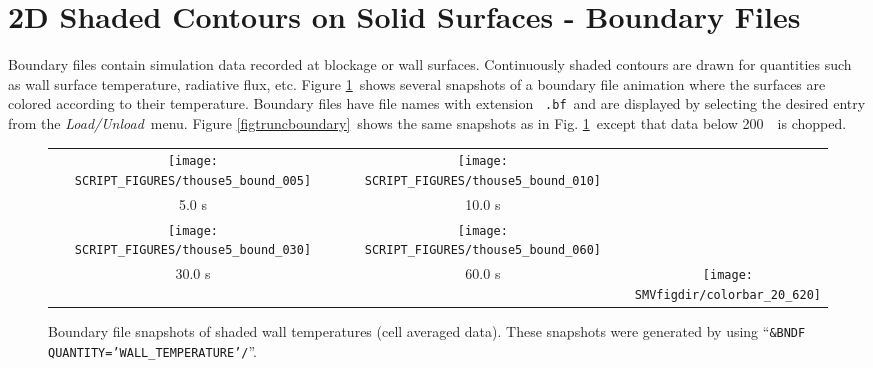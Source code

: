 \documentclass[11pt,twoside]{book}
\newcommand{\figheightAbar}{2.2in}
\begin{document}
\section{2D Shaded Contours on Solid Surfaces - Boundary Files}
\label{section:bf}
Boundary files contain simulation data recorded at blockage or
wall surfaces. Continuously shaded contours are drawn for
quantities such as wall surface temperature, radiative flux, etc.
Figure \ref{figboundary}\ shows several snapshots of a boundary
file animation where the surfaces are colored according to their
temperature. Boundary files have file names with extension {\tt
.bf}\ and are displayed by selecting the desired entry from the
{\em Load/Unload}\  menu. Figure \ref{figtruncboundary}\ shows the
same snapshots as in Fig. \ref{figboundary}\ except that data
below 200~\degC\ is chopped.
\begin{figure}[bph]
\begin{center}
\begin{tabular}{ccc}
\texttt{[image: SCRIPT\_FIGURES/thouse5\_bound\_005]}&
\texttt{[image: SCRIPT\_FIGURES/thouse5\_bound\_010]}\\
5.0 s&10.0 s\\
\texttt{[image: SCRIPT\_FIGURES/thouse5\_bound\_030]}&
\texttt{[image: SCRIPT\_FIGURES/thouse5\_bound\_060]}\\
30.0 s&60.0 s
&\raisebox{0.0ex}[0pt]{\texttt{[image: \\SMVfigdir/colorbar\_20\_620]}}\\
\end{tabular}
\end{center}
\caption [Boundary file snapshots of shaded wall temperatures
contours (cell averaged data).] {Boundary file snapshots of shaded
wall temperatures (cell averaged data). These snapshots were
generated by using ``{\tt\&BNDF QUANTITY='WALL\_TEMPERATURE'/}''.
}
\label{figboundary}%
\end{figure}
\end{document}
